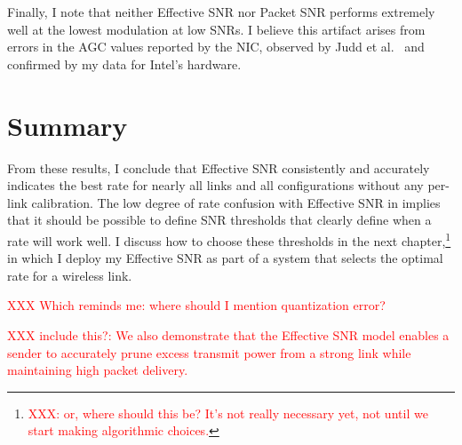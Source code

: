 Finally, I note that neither Effective SNR nor Packet SNR performs extremely well at the lowest modulation at low SNRs. I believe this artifact arises from errors in the AGC values reported by the NIC, observed by Judd et al.~\cite{Judd_CHARM} and confirmed by my data for Intel's hardware.

\section{Summary}
From these results, I conclude that Effective SNR consistently and accurately indicates the best rate for nearly all links and all configurations without any per-link calibration. The low degree of rate confusion with Effective SNR in  implies that it should be possible to define SNR thresholds that clearly define when a rate will work well. I discuss how to choose these thresholds in the next chapter,\footnote{\textcolor{red}{XXX: or, where should this be? It's not really necessary yet, not until we start making algorithmic choices.}} in which I deploy my Effective SNR as part of a system that selects the optimal rate for a wireless link.

\textcolor{red}{XXX Which reminds me: where should I mention quantization error?}

\textcolor{red}{XXX include this?: We also demonstrate that the Effective SNR model enables a sender to accurately prune excess transmit power from a strong link while maintaining high packet delivery.}

\ifx\mainfile\undefined

\fi
